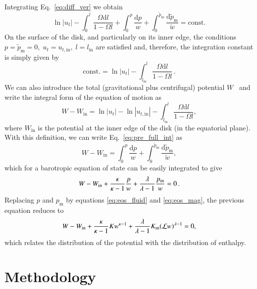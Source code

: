 \documentclass{aa}
\begin{document}
Integrating Eq.~\eqref{eq:diff_ver} we obtain
\begin{equation}\label{eq:pre_full_int}
\ln |u_t| - \int^l_0 \frac{\Omega \mathrm{d}l}{1 - \Omega l} + \int^p_0 \frac{\mathrm{d}p}{w} + \int_0^{\tilde{p}_{\mathrm{m}}} \frac{\mathrm{d}\tilde{p}_{\mathrm{m}}}{\tilde{w}} = \mathrm{const}.
\end{equation}
On the surface of the disk, and particularly on its inner edge, the conditions
$p = \tilde{p}_{\mathrm{m}} = 0, \; u_t = u_{t, \mathrm{in}}, \; l = l_{\mathrm{in}}$
are satisfied and, therefore, the integration constant is simply given by
\begin{equation}
\mathrm{const.} = \ln |u_t| - \int^l_{l_\mathrm{in}} \frac{\Omega \mathrm{d}l}{1 - \Omega l}\,.
\end{equation}
We can also introduce the total (gravitational plus centrifugal) potential $W$~\citep{Abramowicz:1978} and write the integral form of the equation of motion as
\begin{equation}\label{eq:potential}
W - W_{\mathrm{in}} = \ln|u_t| - \ln|u_{t,\mathrm{in}}| - \int^{l}_{l_{\mathrm{in}}} \frac{\Omega \mathrm{d}l}{1 - \Omega l},
\end{equation}
where $W_{\mathrm{in}}$ is the potential at the inner edge of the disk (in the equatorial plane). With this definition, we can write Eq.~\eqref{eq:pre_full_int} as
\begin{equation}\label{eq:full_int}
W - W_{\mathrm{in}} = \int^p_0 \frac{\mathrm{d}p}{w} + \int_0^{\tilde{p}_{\mathrm{m}}} \frac{\mathrm{d}\tilde{p}_{\mathrm{m}}}{\tilde{w}},
\end{equation}
which for a barotropic equation of state can be easily integrated to give
\begin{equation}\label{eq:pre_enthalpy_eq}
W - W_{\rm{in}} + \frac{\kappa}{\kappa - 1}\frac{p}{w} + \frac{\lambda
}{\lambda
 - 1}\frac{p_{\mathrm{m}}}{w} = 0\,.
\end{equation}
Replacing $p$ and $p_{\mathrm{m}}$ by equations \eqref{eq:eos_fluid} and \eqref{eq:eos_mag}, the previous equation reduces to
\begin{equation}\label{eq:enthalpy_eq}
W - W_{\rm{in}} + \frac{\kappa}{\kappa - 1} K w^{\kappa - 1} + \frac{\lambda
}{\lambda
 - 1}K_{\mathrm{m}}(\mathcal{L} w)^{\lambda
 - 1} = 0,
\end{equation}
which relates the distribution of the potential with the distribution of enthalpy.

\section{Methodology}
\label{methodology}
\end{document}
